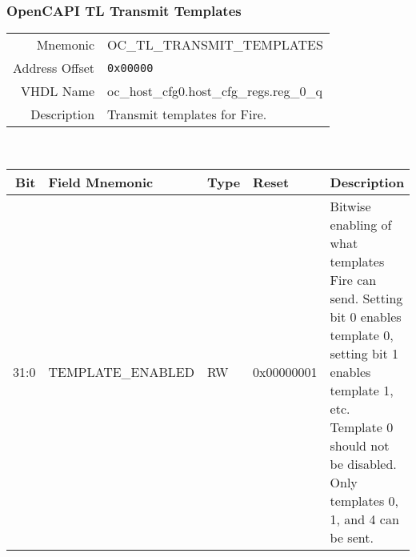\subsubsection{OpenCAPI TL Transmit Templates}
\begin{tabular}{ r | p{350px} }
  Mnemonic       & OC\_TL\_TRANSMIT\_TEMPLATES              \\
  Address Offset & \texttt{0x00000}                         \\
  VHDL Name      & oc\_host\_cfg0.host\_cfg\_regs.reg\_0\_q \\ \hline

  Description &
  Transmit templates for Fire. \\
\end{tabular}
\\
\begin{tabularx}{\textwidth}{r|l|l|l|X}
  \hline
  Bit   & Field Mnemonic    & Type & Reset      & Description \\ \hline

  31:0  & TEMPLATE\_ENABLED & RW   & 0x00000001 &

  Bitwise enabling of what templates Fire can send. Setting bit 0
  enables template 0, setting bit 1 enables template 1, etc. Template
  0 should not be disabled. Only templates 0, 1, and 4 can be sent. \\
\end{tabularx}


